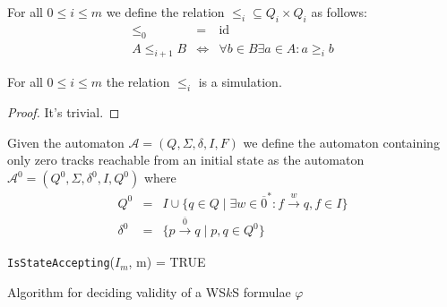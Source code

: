 \begin{defz}
 For all $0 \leq i \leq m$ we define the relation $\leq_i \subseteq Q_i \times
 Q_i$ as follows:
 \begin{eqnarray}
  \leq_0 & = & \text{id}\\
  A \leq_{i+1} B & \Leftrightarrow & \forall b \in B \exists a \in A: a \geq_i
  b
 \end{eqnarray}
\end{defz}

\begin{lemma}
 For all $0 \leq i \leq m$ the relation $\leq_i$ is a simulation.
\end{lemma}
\begin{proof}
 {\color{red} It's trivial.}
\end{proof}

% 

\begin{defz}
Given the automaton $\mathcal{A} = (Q, \Sigma, \delta, I, F)$ we define the
automaton containing only zero tracks reachable from an initial state as the
automaton $\mathcal{A}^0 = (Q^0, \Sigma, \delta^0, I, Q^0)$ where
\begin{eqnarray}
 Q^0 & = & I \cup \{q \in Q \mid \exists w \in \overline{0}^*: f
 \overset{w}{\longrightarrow} q, f \in I\}\\
 \delta^0 & = & \{p \overset{\overline{0}}{\longrightarrow} q \mid p, q \in Q^0\}
\end{eqnarray}
\end{defz}

\begin{algorithm}[ht!]
		\BlankLine
		\nl \Return \texttt{IsStateAccepting}($I_m$, m) = \textsc{TRUE}
		\BlankLine
		\caption{Algorithm for deciding validity of a WS$k$S
		formulae $\varphi$}\label{deciding-wsks-alg}
	\end{algorithm}

